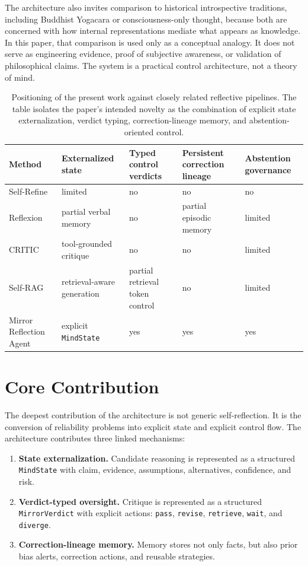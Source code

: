 \documentclass[12pt]{article}
\begin{document}
The architecture also invites comparison to historical introspective traditions, including Buddhist Yogacara or consciousness-only thought, because both are concerned with how internal representations mediate what appears as knowledge. In this paper, that comparison is used only as a conceptual analogy. It does not serve as engineering evidence, proof of subjective awareness, or validation of philosophical claims. The system is a practical control architecture, not a theory of mind.

\begin{table}[H]
\centering
\begin{tabular}{p{3.0cm}p{2.1cm}p{2.2cm}p{2.5cm}p{2.2cm}}
\toprule
Method & Externalized state & Typed control verdicts & Persistent correction lineage & Abstention governance \\
\midrule
Self-Refine & limited & no & no & no \\
Reflexion & partial verbal memory & no & partial episodic memory & limited \\
CRITIC & tool-grounded critique & no & no & limited \\
Self-RAG & retrieval-aware generation & partial retrieval token control & no & limited \\
Mirror Reflection Agent & explicit \texttt{MindState} & yes & yes & yes \\
\bottomrule
\end{tabular}
\caption{Positioning of the present work against closely related reflective pipelines. The table isolates the paper's intended novelty as the combination of explicit state externalization, verdict typing, correction-lineage memory, and abstention-oriented control.}
\label{tab:related-work}
\end{table}

\section{Core Contribution}

The deepest contribution of the architecture is not generic self-reflection. It is the conversion of reliability problems into explicit state and explicit control flow. The architecture contributes three linked mechanisms:

\begin{enumerate}[leftmargin=1.4em]
\item \textbf{State externalization.} Candidate reasoning is represented as a structured \texttt{MindState} with claim, evidence, assumptions, alternatives, confidence, and risk.
\item \textbf{Verdict-typed oversight.} Critique is represented as a structured \texttt{MirrorVerdict} with explicit actions: \texttt{pass}, \texttt{revise}, \texttt{retrieve}, \texttt{wait}, and \texttt{diverge}.
\item \textbf{Correction-lineage memory.} Memory stores not only facts, but also prior bias alerts, correction actions, and reusable strategies.
\end{enumerate}
\end{document}
